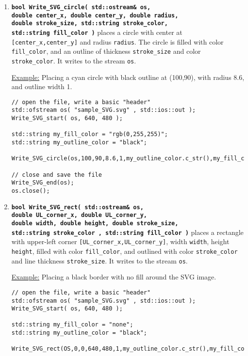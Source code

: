 \documentclass[12pt]{article}
\renewcommand{\v}{\verb}
\newcommand{\smallcode}[1]{\textbf{\texttt{#1}}}
\begin{document}
\begin{enumerate}
\item 
\smallcode{bool Write\_SVG\_circle( std::ostream\& os, \\
\phantom{bool }double center\_x, double center\_y, double radius, \\
\phantom{bool }double stroke\_size, std::string stroke\_color, \\
\phantom{bool }std::string fill\_color )} places a circle with center at 
\v|[center_x,center_y]| and radius \v|radius|. The circle is filled with 
color \v|fill_color|, and an outline of thickness \v|stroke_size| 
and color \v|stroke_color|. It writes to the stream \v|os|. 

\underline{Example:} Placing a cyan circle with black outline at 
(100,90), with radius 8.6, and outline width 1. 
\begin{verbatim}
// open the file, write a basic "header"
std::ofstream os( "sample_SVG.svg" , std::ios::out );
Write_SVG_start( os, 640, 480 ); 

std::string my_fill_color = "rgb(0,255,255)"; 
std::string my_outline_color = "black"; 

Write_SVG_circle(os,100,90,8.6,1,my_outline_color.c_str(),my_fill_color.c_str()); 

// close and save the file 
Write_SVG_end(os); 
os.close(); 
\end{verbatim}

\item 
\smallcode{bool Write\_SVG\_rect( std::ostream\& os, \\
\phantom{bool }double UL\_corner\_x, double UL\_corner\_y, \\
\phantom{bool }double width, double height, double stroke\_size, \\
\phantom{bool }std::string stroke\_color , std::string fill\_color )} 
places a rectangle with upper-left corner 
\v|[UL_corner_x,UL_corner_y]|, width \v|width|, height \v|height|, 
filled with color \v|fill_color|, and outlined with color 
\v|stroke_color| and line thickness \v|stroke_size|.  
It writes to the stream \v|os|. 

\underline{Example:} Placing a black border with no fill around the 
SVG image. 
\begin{verbatim}
// open the file, write a basic "header"
std::ofstream os( "sample_SVG.svg" , std::ios::out );
Write_SVG_start( os, 640, 480 ); 

std::string my_fill_color = "none"; 
std::string my_outline_color = "black"; 

Write_SVG_rect(OS,0,0,640,480,1,my_outline_color.c_str(),my_fill_color.c_str());  
 

\end{verbatim}
\end{enumerate}
\end{document}

